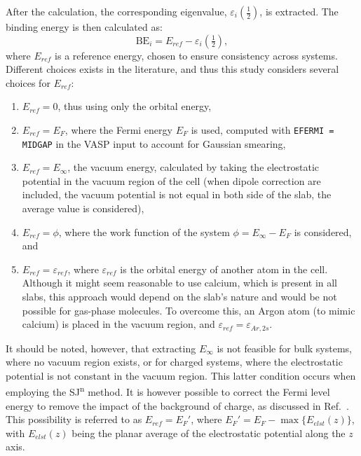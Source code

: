 \documentclass[journal=jpccck,manuscript=article]{achemso}
\begin{document}
After the calculation, the corresponding eigenvalue, $\varepsilon_i\left(\frac{1}{2}\right)$, is extracted. The binding energy is then calculated as:
\begin{equation}
	\text{BE}_i = 
	E_{ref}- \varepsilon_i\left(\tfrac{1}{2}\right), \label{eq:xpsbe}
\end{equation}
where $E_{ref}$ is a reference energy, chosen to ensure consistency across systems. Different choices exists in the literature, and thus this study considers several choices for $E_{ref}$:
\begin{enumerate}
	\item $E_{ref}=0$, thus using only the orbital energy,
	\item $E_{ref}=E_F$, where the Fermi energy $E_F$ is used, computed with \texttt{EFERMI = MIDGAP} in the VASP input to account for Gaussian smearing,
	\item $E_{ref}=E_\infty$, the vacuum energy, calculated by taking the electrostatic potential in the vacuum region of the cell (when dipole correction are included, the vacuum potential is not equal in both side of the slab, the average value is considered),
	\item $E_{ref}=\phi$, where the work function of the system $\phi = E_\infty - E_F$ is considered\cite{kahnFermiLevelWork2015}, and
	\item $E_{ref}= \varepsilon_{ref}$, where $\varepsilon_{ref}$ is the orbital energy of another atom in the cell. Although it might seem reasonable to use calcium, which is present in all slabs, this approach would depend on the slab's nature and would be not possible for gas-phase molecules. To overcome this, an Argon atom (to mimic calcium) is placed in the vacuum region, and $\varepsilon_{ref}=\varepsilon_{Ar,2s}$.
\end{enumerate}
It should be noted, however, that extracting $E_\infty$ is not feasible for bulk systems, where no vacuum region exists, or for charged systems, where the electrostatic potential is not constant in the vacuum region. This latter condition occurs when employing the SJ\textsuperscript{n} method. It is however possible to correct the Fermi level energy to remove the impact of the background of charge, as discussed in Ref.~. This possibility is referred to as $E_{ref}=E_F'$, where $E_F' = E_F - \max\{E_{elst}(z)\}$, with $E_{elst}(z)$ being the planar average of the electrostatic potential along the $z$ axis.
\end{document}
